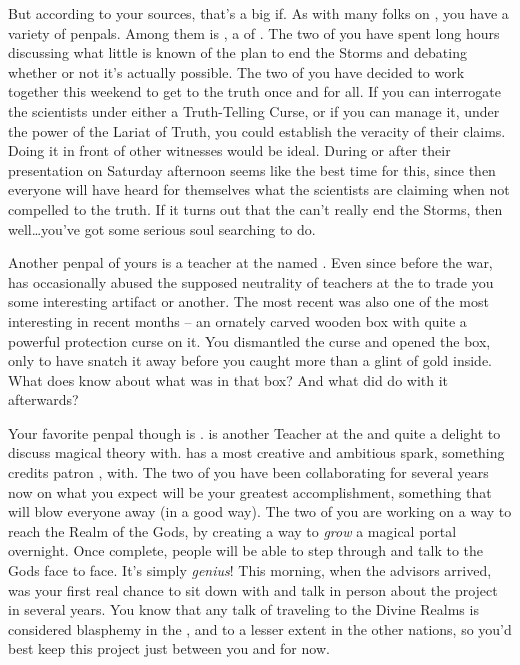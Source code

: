 \documentclass[char]{GL2020}
\begin{document}
But according to your sources, that's a big if. As with many folks on \pEarth{}, you have a variety of penpals. Among them is \cHedonist{\full}, a \cHedonist{\cleric} of \cFarmGod{}. The two of you have spent long hours discussing what little is known of the \pTech{} plan to end the Storms and debating whether or not it's actually possible. The two of you have decided to work together this weekend to get to the truth once and for all. If you can interrogate the scientists under either a Truth-Telling Curse, or if you can manage it, under the power of the Lariat of Truth, you could establish the veracity of their claims. Doing it in front of other witnesses would be ideal. During or after their presentation on Saturday afternoon seems like the best time for this, since then everyone will have heard for themselves what the scientists are claiming when not compelled to the truth. If it turns out that the \pTech{} can't really end the Storms, then well\ldots you've got some serious soul searching to do.

Another penpal of yours is a teacher at the \pSc{} named \cChupSecond{\full}. Even since before the war, \cChupSecond{} has occasionally abused the supposed neutrality of teachers at the \pSc{} to trade you some interesting artifact \cChupSecond{\they} \cChupSecond{\have} or another. The most recent was also one of the most interesting in recent months -- an ornately carved wooden box with quite a powerful protection curse on it. You dismantled the curse and opened the box, only to have \cChupSecond{} snatch it away before you caught more than a glint of gold inside. What does \cChupSecond{} know about what was in that box? And what did \cChupSecond{\they} do with it afterwards?

Your favorite penpal though is \cFlowPriest{\full}. \cFlowPriest{} is another Teacher at the \pSchool{} and quite a delight to discuss magical theory with. \cFlowPriest{} has a most creative and ambitious spark, something \cFlowPriest{\they} credits \cFlowPriest{\their} patron \cFlow{\God}, \cFlowFull{\full} with. The two of you have been collaborating for several years now on what you expect will be your greatest accomplishment, something that will blow everyone away (in a good way). The two of you are working on a way to reach the Realm of the Gods, by creating a way to \emph{grow} a magical portal overnight. Once complete, people will be able to step through and talk to the Gods face to face. It's simply \emph{genius}! This morning, when the advisors arrived, was your first real chance to sit down with \cFlowPriest{} and talk in person about the project in several years. You know that any talk of traveling to the Divine Realms is considered blasphemy in the \pFarm{}, and to a lesser extent in the other nations, so you'd best keep this project just between you and \cFlowPriest{} for now.
\end{document}
